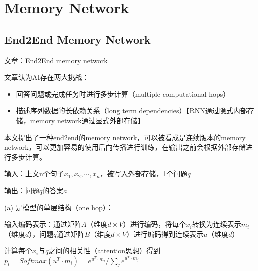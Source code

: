 \section{Memory Network}

\subsection{End2End Memory Network}
文章：\href{https://arxiv.org/abs/1503.08895}{End2End memory network}

文章认为AI存在两大挑战：
\begin{itemize}
\item 回答问题或完成任务时进行多步计算（multiple computational hops）
\item 描述序列数据的长依赖关系（long term dependencies）【RNN通过隐式内部存储，memory network通过显式外部存储】
\end{itemize}
本文提出了一种end2end的memory network，可以被看成是连续版本的memory network，可以更加容易的使用后向传播进行训练，在输出之前会根据外部存储进行多步计算。


输入：上文n个句子$x_1, x_2, \cdots, x_n$，被写入外部存储，1个问题$q$

输出：问题$q$的答案$a$



(a) 是模型的单层结构（one hop）：

输入编码表示：通过矩阵$A$（维度$d \times V$）进行编码，将每个$x_i$转换为连续表示$m_i$（维度$d$），问题$q$通过矩阵$B$（维度$d \times V$）进行编码得到连续表示$u$（维度$d$）

计算每个$x_i$与$q$之间的相关性（attention思想）得到$p_i = Softmax(u^T · m_i) = e^{u^T · m_i} / \sum_j{ e^{u^T · m_j} }$




